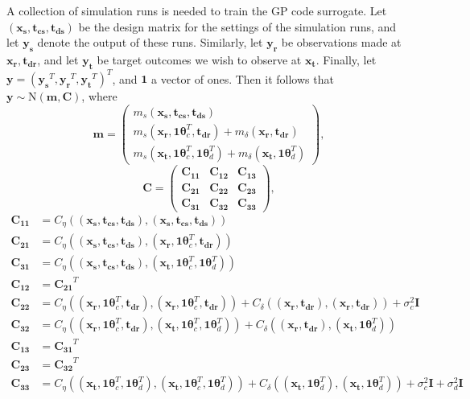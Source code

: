 \documentclass[12pt]{article}
\begin{document}
%
A collection of simulation runs is needed to train the GP code surrogate.
%
Let $(\mathbf{x_s},\mathbf{t_{cs}},\mathbf{t_{ds}})$ be the design matrix for the settings of the simulation runs, and let $\mathbf{y_s}$ denote the output of these runs.
%
Similarly, let $\mathbf{y_r}$ be observations made at $\mathbf{x_r},\mathbf{t_{dr}}$, and let $\mathbf {y_t}$ be target outcomes we wish to observe at $\mathbf {x_t}$.
%
Finally, let $\mathbf y = (\mathbf{y_s}^T,\mathbf{y_r}^T,\mathbf{y_t}^T)^T$, and $\mathbf 1$ a vector of ones.
%
Then it follows that $\mathbf y\sim \mathrm{N}(\mathbf m,\mathbf C)$, where
\[
\mathbf m = \begin{pmatrix}
m_s(\mathbf{x_s},\mathbf{t_{cs}},\mathbf{t_{ds}})\\
m_s(\mathbf{x_r},\mathbf1\boldsymbol\theta_c^T,\mathbf{t_{dr}}) + m_\delta(\mathbf{x_r},\mathbf{t_{dr}})\\
m_s(\mathbf{x_t},\mathbf1\boldsymbol\theta_c^T,\mathbf1\boldsymbol\theta_d^T) + m_\delta(\mathbf{x_t},\mathbf1\boldsymbol\theta_d^T)
\end{pmatrix},
\]
\[
\mathbf C = \begin{pmatrix}
\mathbf{C_{11}} & \mathbf{C_{12}} & \mathbf{C_{13}}\\
\mathbf{C_{21}} & \mathbf{C_{22}} & \mathbf{C_{23}}\\
\mathbf{C_{31}} & \mathbf{C_{32}} & \mathbf{C_{33}}
\end{pmatrix},
\]
\begin{align*}
\mathbf{C_{11}}&=C_\eta\left((\mathbf{x_s},\mathbf{t_{cs}},\mathbf{t_{ds}}),(\mathbf{x_s},\mathbf{t_{cs}},\mathbf{t_{ds}})\right)\\
\mathbf{C_{21}}&=C_\eta\left((\mathbf{x_s},\mathbf{t_{cs}},\mathbf{t_{ds}}),(\mathbf{x_r},\mathbf1\boldsymbol\theta_c^T,\mathbf{t_{dr}})\right)\\
\mathbf{C_{31}}&=C_\eta\left((\mathbf{x_s},\mathbf{t_{cs}},\mathbf{t_{ds}}),(\mathbf{x_t},\mathbf1\boldsymbol\theta_c^T,\mathbf1\boldsymbol\theta_d^T)\right)\\
\mathbf{C_{12}}&=\mathbf{C_{21}}^T\\
\mathbf{C_{22}}&=C_\eta\left((\mathbf{x_r},\mathbf1\boldsymbol\theta_c^T,\mathbf{t_{dr}}),(\mathbf{x_r},\mathbf1\boldsymbol\theta_c^T,\mathbf{t_{dr}})\right) + C_\delta\left( (\mathbf{x_r},\mathbf{t_{dr}}),(\mathbf{x_r},\mathbf{t_{dr}}) \right) + \sigma^2_c \mathbf I\\
\mathbf{C_{32}}&=C_\eta\left((\mathbf{x_r},\mathbf1\boldsymbol\theta_c^T,\mathbf{t_{dr}}),(\mathbf{x_t},\mathbf1\boldsymbol\theta_c^T,\mathbf1\boldsymbol\theta_d^T)\right) + C_\delta\left( (\mathbf{x_r},\mathbf{t_{dr}}),(\mathbf{x_t},\mathbf1\boldsymbol\theta_d^T) \right)\\
\mathbf{C_{13}}&=\mathbf{C_{31}}^T\\
\mathbf{C_{23}}&=\mathbf{C_{32}}^T\\
\mathbf{C_{33}}&=C_\eta\left((\mathbf{x_t},\mathbf1\boldsymbol\theta_c^T,\mathbf1\boldsymbol\theta_d^T),(\mathbf{x_t},\mathbf1\boldsymbol\theta_c^T,\mathbf1\boldsymbol\theta_d^T)\right) + C_\delta\left( (\mathbf{x_t},\mathbf1\boldsymbol\theta_d^T),(\mathbf{x_t},\mathbf1\boldsymbol\theta_d^T) \right) + \sigma^2_c\mathbf I + \sigma^2_d \mathbf I
\end{align*}
\end{document}
